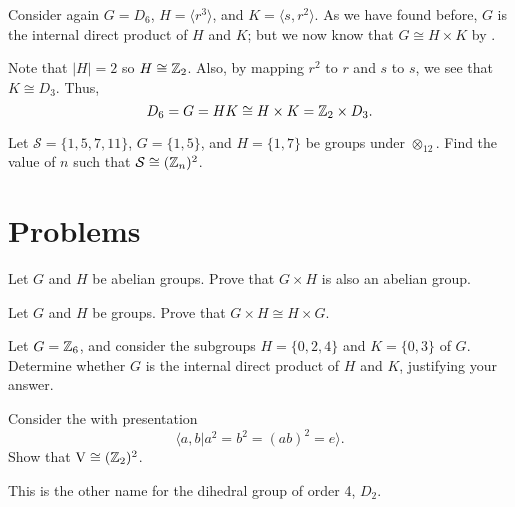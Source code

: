 \begin{example}
    Consider again $G = D_6$, $H = \langle r^3 \rangle$, and $K = \langle s, r^2 \rangle$. As we have found before, $G$ is the internal direct product of $H$ and $K$; but we now know that $G \cong H \times K$ by .

    Note that $|H| = 2$ so $H \cong \mathbb{Z}_2$. Also, by mapping $r^2$ to $r$ and $s$ to $s$, we see that $K \cong D_3$. Thus,
    \[
        D_6 = G = HK \cong H \times K = \mathbb{Z}_2 \times D_3.
    \]
\end{example}

\begin{exercise}
    Let $\mathcal{S} = \{1, 5, 7, 11\}$, $G = \{1, 5\}$, and $H = \{1, 7\}$ be groups under $\otimes_{12}$. Find the value of $n$ such that $\mathcal{S} \cong (\mathbb{Z}_n)^2$.
\end{exercise}

\newpage

\section{Problems}
\begin{problem}\label{problem-external-direct-product-of-abelian-groups-is-abelian}
    Let $G$ and $H$ be abelian groups. Prove that $G \times H$ is also an abelian group.
\end{problem}

\begin{problem}
    Let $G$ and $H$ be groups. Prove that $G \times H \cong H \times G$.
\end{problem}

\begin{problem}
    Let $G = \mathbb{Z}_6$, and consider the subgroups $H = \{0, 2, 4\}$ and $K = \{0, 3\}$ of $G$. Determine whether $G$ is the internal direct product of $H$ and $K$, justifying your answer.
\end{problem}

\begin{problem}
    Consider the  with presentation
    \[
        \langle a, b \vert a^2 = b^2 = (ab)^2 = e \rangle.
    \]
    Show that $\mathrm{V} \cong (\mathbb{Z}_2)^2$.
\end{problem}
\begin{remark}
    This is the other name for the dihedral group of order 4, $D_2$.
\end{remark}
